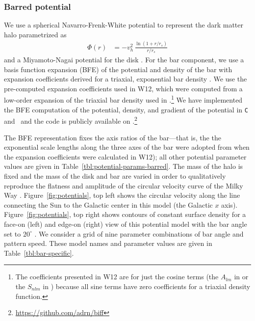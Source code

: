 \documentclass[letterpaper,12pt,preprint]{aastex}
\begin{document}
\subsubsection{Barred potential}
We use a spherical Navarro-Frenk-White potential to represent the dark matter halo \citep{navarro96} parametrized as
\begin{align}
	\Phi(r) &= -v_h^2\,\frac{\ln{(1 + r/r_s)}}{r/r_s}\label{eq:nfw}
\end{align}
and a Miyamoto-Nagai potential for the disk \citep{miyamoto75}. For the bar component, we use a basis function expansion (BFE) of the potential and density of the bar with expansion coefficients derived for a triaxial, exponential bar density \citep[][hereafter W12]{wang12}. We use the pre-computed expansion coefficients used in W12, which were computed from a low-order expansion of the triaxial bar density used in \citet{dwek95}.\footnote{The coefficients presented in W12 are for just the cosine terms (the $A_{lm}$ in \citet{hernquist92} or the $S_{nlm}$ in \citet{lowing11}) because all sine terms have zero coefficients for a triaxial density function.} We have implemented the BFE computation of the potential, density, and gradient of the potential in \texttt{C} and \python\ and the code is publicly available on \github.\footnote{\url{https://github.com/adrn/biff}} 

The BFE representation fixes the axis ratios of the bar---that is, the the exponential scale lengths along the three axes of the bar were adopted from \cite{dwek95} when the expansion coefficients were calculated in W12); all other potential parameter values are given in Table~\ref{tbl:potential-params-barred}. The mass of the halo is fixed and the mass of the disk and bar are varied in order to qualitatively reproduce the flatness and amplitude of the circular velocity curve of the Milky Way \citep{bovy12}. Figure~\ref{fig:potentials}, top left shows the circular velocity along the line connecting the Sun to the Galactic center in this model (the Galactic $x$ axis). Figure~\ref{fig:potentials}, top right shows contours of constant surface density for a face-on (left) and edge-on (right) view of this potential model with the bar angle set to $20^\circ$ \citep[compare to, e.g., Figure 3 in][]{portail15}. We consider a grid of nine parameter combinations of bar angle and pattern speed. These model names and parameter values are given in Table~\ref{tbl:bar-specific}.
\end{document}
